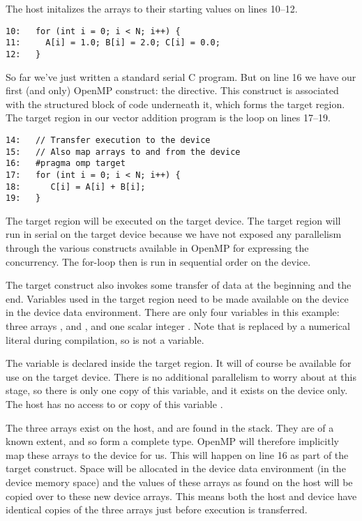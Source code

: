 The host initalizes the arrays to their starting values on lines 10--12.

\begin{verbatim}
10:   for (int i = 0; i < N; i++) {
11:     A[i] = 1.0; B[i] = 2.0; C[i] = 0.0;
12:   }
\end{verbatim}

So far we've just written a standard serial C program.
But on line 16 we have our first (and only) OpenMP construct: the  directive.
This construct is associated with the structured block of code underneath it, which forms the target region.
The target region in our vector addition program is the  loop on lines 17--19.
\begin{verbatim}
14:   // Transfer execution to the device
15:   // Also map arrays to and from the device
16:   #pragma omp target
17:   for (int i = 0; i < N; i++) {
18:      C[i] = A[i] + B[i];
19:   }
\end{verbatim}
The target region will be executed on the target device.
The target region will run in serial on the target device because we have not exposed any parallelism through the various constructs available in OpenMP for expressing the concurrency.
The for-loop then is run in sequential order on the device.

The target construct also invokes some transfer of data at the beginning and the end.
Variables used in the target region need to be made available on the device in the device data environment.
There are only four variables in this example: three arrays ,  and , and one scalar integer .
Note that  is replaced by a numerical literal during compilation, so is not a variable.

The variable  is declared inside the target region.
It will of course be available for use on the target device.
There is no additional parallelism to worry about at this stage, so there is only one copy of this variable, and it exists on the device only.
The host has no access to or copy of this variable .

The three arrays exist on the host, and are found in the stack.
They are of a known extent, and so form a complete type.
OpenMP will therefore implicitly map these arrays to the device for us.
This will happen on line 16 as part of the target construct.
Space will be allocated in the device data environment (in the device memory space) and the values of these arrays as found on the host will be copied over to these new device arrays.
This means both the host and device have identical copies of the three arrays just before execution is transferred.

